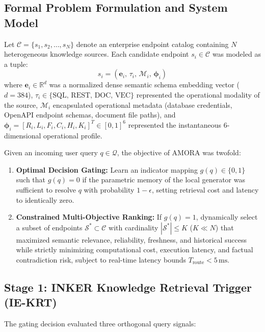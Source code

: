 \documentclass[conference,onecolumn,10pt]{IEEEtran}
\begin{document}
\subsection{Formal Problem Formulation and System Model}
\label{subsec:problem_formulation}
Let $\mathcal{C} = \{s_1, s_2, \dots, s_N\}$ denote an enterprise endpoint catalog containing $N$ heterogeneous knowledge sources. Each candidate endpoint $s_i \in \mathcal{C}$ was modeled as a tuple:
\begin{equation}
    s_i = \left( \mathbf{e}_i, \, \tau_i, \, \mathcal{M}_i, \, \boldsymbol{\phi}_i \right)
\end{equation}
where $\mathbf{e}_i \in \mathbb{R}^d$ was a normalized dense semantic schema embedding vector ($d = 384$), $\tau_i \in \{\text{SQL}, \, \text{REST}, \, \text{DOC}, \, \text{VEC}\}$ represented the operational modality of the source, $\mathcal{M}_i$ encapsulated operational metadata (database credentials, OpenAPI endpoint schemas, document file paths), and $\boldsymbol{\phi}_i = [R_i, L_i, F_i, C_i, H_i, K_i]^T \in [0, 1]^6$ represented the instantaneous 6-dimensional operational profile.

Given an incoming user query $q \in \mathcal{Q}$, the objective of AMORA was twofold:
\begin{enumerate}
    \item \textbf{Optimal Decision Gating:} Learn an indicator mapping $g(q) \in \{0, 1\}$ such that $g(q) = 0$ if the parametric memory of the local generator was sufficient to resolve $q$ with probability $1 - \epsilon$, setting retrieval cost and latency to identically zero.
    \item \textbf{Constrained Multi-Objective Ranking:} If $g(q) = 1$, dynamically select a subset of endpoints $\mathcal{S}^* \subset \mathcal{C}$ with cardinality $|\mathcal{S}^*| \le K$ ($K \ll N$) that maximized semantic relevance, reliability, freshness, and historical success while strictly minimizing computational cost, execution latency, and factual contradiction risk, subject to real-time latency bounds $T_{\text{route}} < 5\,\text{ms}$.
\end{enumerate}

\subsection{Stage 1: INKER Knowledge Retrieval Trigger (IE-KRT)}
\label{subsec:stage1_krt}
The gating decision evaluated three orthogonal query signals:
\end{document}
